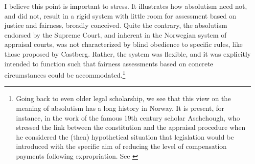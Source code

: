 I believe this point is important to stress. It illustrates how absolutism need not, and did not, result in a rigid system with little room for assessment based on justice and fairness, broadly conceived. Quite the contrary, the absolutism endorsed by the Supreme Court, and inherent in the Norwegian system of appraisal courts, was not characterized by blind obedience to specific rules, like those proposed by Castberg. Rather, the system was flexible, and it was explicitly intended to function such that fairness assessments based on concrete circumstances could be accommodated.\footnote{Going back to even older legal scholarship, we see that this view on the meaning of absolutism has a long history in Norway. It is present, for instance, in the work of the famous 19th century scholar Aschehough, who stressed the link between the constitution and the appraisal procedure when he considered the (then) hypothetical situation that legislation would be introduced with the specific aim of reducing the level of compensation payments following expropriation. See \cite[48]{aschehough93} 

}
